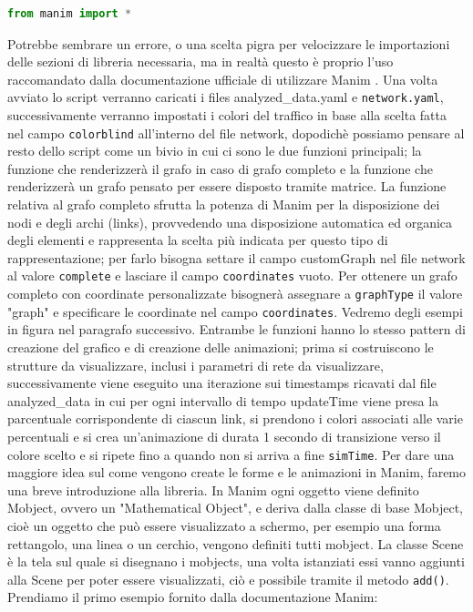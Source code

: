 \documentclass[binding=0.6cm]{sapthesis}
\begin{document}
{\scriptsize
\begin{lstlisting}[language=Python]
    from manim import *
\end{lstlisting}
}

Potrebbe sembrare un errore, o una scelta pigra per velocizzare le importazioni delle sezioni di libreria necessaria, ma in realtà questo è proprio
l'uso raccomandato dalla documentazione ufficiale di utilizzare Manim \cite{ManimDocs}.
Una volta avviato lo script verranno caricati i files analyzed\_data.yaml e \texttt{network.yaml}, successivamente verranno impostati i colori del traffico in base
alla scelta fatta nel campo \texttt{colorblind} all'interno del file network, dopodichè possiamo pensare al resto dello script come un bivio in cui ci sono le due funzioni principali;
la funzione che renderizzerà il grafo in caso di grafo completo e la funzione che renderizzerà un grafo pensato per essere disposto
tramite matrice. La funzione relativa al grafo completo sfrutta la potenza di Manim per la disposizione dei nodi e degli archi (links), provvedendo
una disposizione automatica ed organica degli elementi e rappresenta la scelta più indicata per questo tipo di rappresentazione; per
farlo bisogna settare il campo customGraph nel file network al valore \texttt{complete} e lasciare il campo \texttt{coordinates} vuoto. Per ottenere un grafo
completo con coordinate personalizzate bisognerà assegnare a \texttt{graphType} il valore "graph" e specificare le coordinate nel campo \texttt{coordinates}. 
Vedremo degli esempi in figura nel paragrafo successivo. Entrambe le funzioni hanno lo stesso pattern di creazione del grafico e di creazione delle animazioni;
prima si costruiscono le strutture da visualizzare, inclusi i parametri di rete da visualizzare, successivamente viene eseguito una iterazione sui timestamps ricavati
dal file analyzed\_data in cui per ogni intervallo di tempo updateTime viene presa la parcentuale corrispondente di ciascun link, 
si prendono i colori associati alle varie percentuali e si crea un'animazione di durata 1 secondo di transizione verso il colore scelto e si ripete 
fino a quando non si arriva a fine \texttt{simTime}.
Per dare una maggiore idea sul come vengono create le forme e le animazioni in Manim, faremo una breve introduzione alla libreria.
In Manim ogni oggetto viene definito Mobject, ovvero un "Mathematical Object", e deriva dalla classe di base Mobject, cioè un oggetto che può essere visualizzato a schermo,
per esempio una forma rettangolo, una linea o un cerchio, vengono definiti tutti mobject.
La classe Scene è la tela sul quale si disegnano i mobjects, una volta istanziati essi vanno aggiunti alla Scene per poter essere visualizzati,
ciò e possibile tramite il metodo \lstinline|add()|. Prendiamo il primo esempio fornito dalla documentazione Manim:
\end{document}
